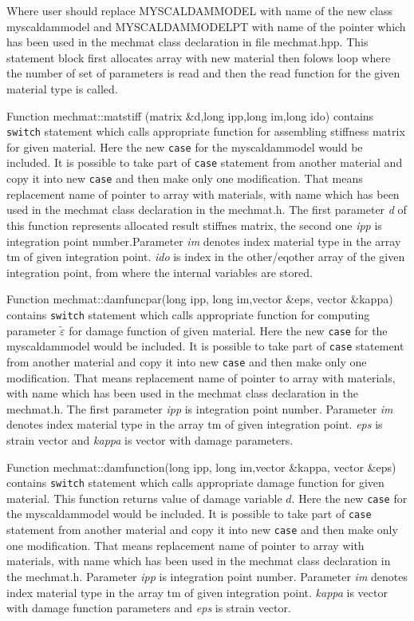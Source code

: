 Where user should replace MYSCALDAMMODEL with name of the new class {\sf myscaldammodel} and MYSCALDAMMODELPT with
name of the pointer which has been used in the {\sf mechmat} class declaration in file mechmat.hpp. This
statement block first allocates array with new material then folows loop where the number of set of parameters is
read and then the {\sf read} function for the given material type is called.

Function {\sf mechmat::matstiff (matrix \&d,long ipp,long im,long ido)} contains {\tt switch} statement which calls appropriate function
for assembling stiffness matrix for given material. Here the new {\tt case} for the  {\sf myscaldammodel} would be included.
It is possible to take part of {\tt case} statement from another material and copy it into new {\tt case} and then
make only one modification. That means replacement name of pointer to array with materials, with name which has been used
in the {\sf mechmat} class declaration in the mechmat.h. The first parameter {\it d} of this function represents allocated
result stiffnes matrix, the second one {\it ipp} is integration point number.Parameter {\it im} denotes
index material type in the array {\sf tm} of given integration point. {\it ido} is index in the
{\sf other/eqother} array of the given integration point, from where the internal variables are stored.


Function {\sf mechmat::damfuncpar(long ipp, long im,vector \&eps, vector \&kappa)} contains {\tt switch} statement which calls
appropriate function for computing parameter $\tilde{\varepsilon}$ for damage function of given material. Here the new
{\tt case} for the  {\sf myscaldammodel} would be included. It is possible to take part of {\tt case} statement from
another material and copy it into new {\tt case} and then make only one modification. That means replacement
name of pointer to array with materials, with name which has been used in the {\sf mechmat} class declaration in the mechmat.h.
The first parameter {\it ipp} is integration point number. Parameter {\it im} denotes index material type in the array {\sf tm} 
of given integration point. {\it eps} is strain vector and {\it kappa} is vector with
damage parameters.

Function {\sf mechmat::damfunction(long ipp, long im,vector \&kappa, vector \&eps)} contains {\tt switch} statement which calls
appropriate damage function for given material. This function returns value of damage variable $d$. Here the new
{\tt case} for the  {\sf myscaldammodel} would be included. It is possible to take part of {\tt case} statement from
another material and copy it into new {\tt case} and then make only one modification. That means replacement name of pointer
to array with materials, with name which has been used in the {\sf mechmat} class declaration in the mechmat.h.
Parameter {\it ipp} is integration point number. Parameter {\it im} denotes index material type in the array {\sf tm} of given integration point. 
{\it kappa} is vector with damage function parameters and {\it eps} is strain vector.

